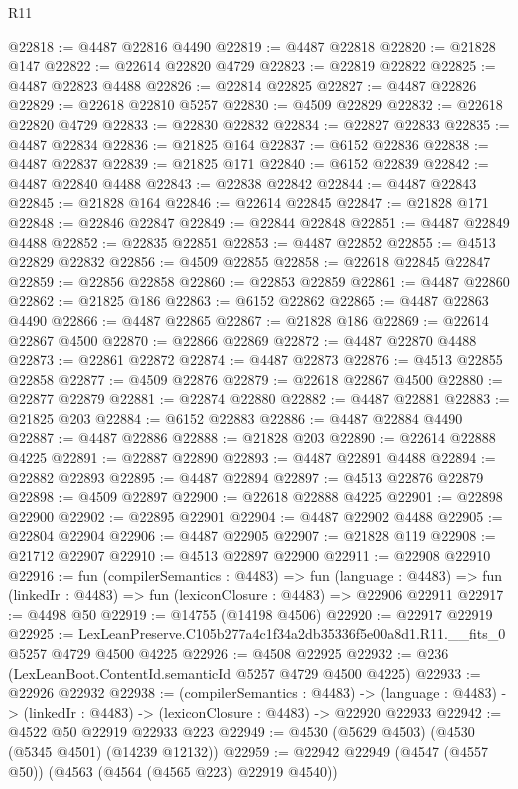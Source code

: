 \begin{lexlean}{R11}
\begin{coremodule}
@22818 := @4487 @22816 @4490
@22819 := @4487 @22818
@22820 := @21828 @147
@22822 := @22614 @22820 @4729
@22823 := @22819 @22822
@22825 := @4487 @22823 @4488
@22826 := @22814 @22825
@22827 := @4487 @22826
@22829 := @22618 @22810 @5257
@22830 := @4509 @22829
@22832 := @22618 @22820 @4729
@22833 := @22830 @22832
@22834 := @22827 @22833
@22835 := @4487 @22834
@22836 := @21825 @164
@22837 := @6152 @22836
@22838 := @4487 @22837
@22839 := @21825 @171
@22840 := @6152 @22839
@22842 := @4487 @22840 @4488
@22843 := @22838 @22842
@22844 := @4487 @22843
@22845 := @21828 @164
@22846 := @22614 @22845
@22847 := @21828 @171
@22848 := @22846 @22847
@22849 := @22844 @22848
@22851 := @4487 @22849 @4488
@22852 := @22835 @22851
@22853 := @4487 @22852
@22855 := @4513 @22829 @22832
@22856 := @4509 @22855
@22858 := @22618 @22845 @22847
@22859 := @22856 @22858
@22860 := @22853 @22859
@22861 := @4487 @22860
@22862 := @21825 @186
@22863 := @6152 @22862
@22865 := @4487 @22863 @4490
@22866 := @4487 @22865
@22867 := @21828 @186
@22869 := @22614 @22867 @4500
@22870 := @22866 @22869
@22872 := @4487 @22870 @4488
@22873 := @22861 @22872
@22874 := @4487 @22873
@22876 := @4513 @22855 @22858
@22877 := @4509 @22876
@22879 := @22618 @22867 @4500
@22880 := @22877 @22879
@22881 := @22874 @22880
@22882 := @4487 @22881
@22883 := @21825 @203
@22884 := @6152 @22883
@22886 := @4487 @22884 @4490
@22887 := @4487 @22886
@22888 := @21828 @203
@22890 := @22614 @22888 @4225
@22891 := @22887 @22890
@22893 := @4487 @22891 @4488
@22894 := @22882 @22893
@22895 := @4487 @22894
@22897 := @4513 @22876 @22879
@22898 := @4509 @22897
@22900 := @22618 @22888 @4225
@22901 := @22898 @22900
@22902 := @22895 @22901
@22904 := @4487 @22902 @4488
@22905 := @22804 @22904
@22906 := @4487 @22905
@22907 := @21828 @119
@22908 := @21712 @22907
@22910 := @4513 @22897 @22900
@22911 := @22908 @22910
@22916 := fun (compilerSemantics : @4483) =>
  fun (language : @4483) => fun (linkedIr : @4483) => fun (lexiconClosure : @4483) => @22906 @22911
@22917 := @4498 @50
@22919 := @14755 (@14198 @4506)
@22920 := @22917 @22919
@22925 := LexLeanPreserve.C105b277a4c1f34a2db35336f5e00a8d1.R11.__fits_0 @5257 @4729 @4500 @4225
@22926 := @4508 @22925
@22932 := @236 (LexLeanBoot.ContentId.semanticId @5257 @4729 @4500 @4225)
@22933 := @22926 @22932
@22938 := (compilerSemantics : @4483) ->
  (language : @4483) -> (linkedIr : @4483) -> (lexiconClosure : @4483) -> @22920 @22933
@22942 := @4522 @50 @22919 @22933 @223
@22949 := @4530 (@5629 @4503) (@4530 (@5345 @4501) (@14239 @12132))
@22959 := @22942 @22949 (@4547 (@4557 @50)) (@4563 (@4564 (@4565 @223) @22919 @4540))

\end{coremodule}
\end{lexlean}
